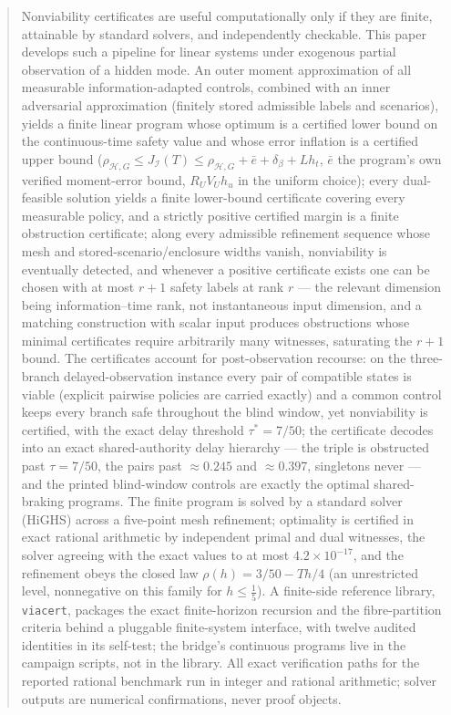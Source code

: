 \documentclass[10pt,twocolumn]{article}
\theoremstyle{plain}
\theoremstyle{definition}
\theoremstyle{remark}
\begin{document}
\begin{abstract}
Nonviability certificates are useful computationally only if they are finite,
attainable by standard solvers, and independently checkable. This paper
develops such a pipeline for linear systems under exogenous partial
observation of a hidden mode. An outer moment approximation of all measurable
information-adapted controls, combined with an inner adversarial approximation (finitely stored
admissible labels and scenarios), yields a finite linear program whose
optimum is a certified lower bound on the continuous-time safety value and
whose error inflation is a certified upper bound
(\(\rho_{\mathcal{H},G} \le J_{\mathcal{I}}(T) \le \rho_{\mathcal{H},G} +
\bar{e} + \delta_\beta + L h_t\), \(\bar{e}\) the program's own verified
moment-error bound, \(R_U V_U h_u\) in the uniform choice); every dual-feasible solution yields a finite lower-bound certificate
covering every measurable policy, and a strictly positive certified margin
is a finite obstruction certificate; along every admissible refinement
sequence whose mesh and stored-scenario/enclosure widths vanish,
nonviability is eventually detected, and whenever a positive certificate exists one can be
chosen with at most \(r + 1\) safety labels at rank \(r\) --- the relevant
dimension being information--time rank, not instantaneous input dimension,
and a matching construction with scalar input produces obstructions whose
minimal certificates require arbitrarily many witnesses, saturating the
\(r + 1\) bound. The certificates account for post-observation
recourse: on the three-branch delayed-observation instance every pair of compatible
states is viable (explicit pairwise policies are carried exactly) and a
common control keeps every branch safe throughout the blind window, yet nonviability is certified, with the exact
delay threshold \(\tau^{*} = 7/50\); the certificate decodes into an
exact shared-authority delay hierarchy --- the triple is obstructed past
\(\tau = 7/50\), the pairs past \(\approx 0.245\) and \(\approx
0.397\), singletons never --- and the printed blind-window controls are
exactly the optimal shared-braking programs. The finite program is solved by a
standard solver (HiGHS) across a five-point mesh refinement; optimality is
certified in exact rational arithmetic by independent primal and dual
witnesses, the solver agreeing with the exact values to at most
\(4.2 \times 10^{-17}\), and the refinement obeys the closed law
\(\rho(h) = 3/50 - Th/4\) (an unrestricted level, nonnegative on this
family for \(h \le \tfrac15\)). A finite-side reference library,
\texttt{viacert}, packages the exact finite-horizon recursion and the
fibre-partition criteria behind a pluggable finite-system interface, with
twelve audited identities in its self-test; the bridge's continuous
programs live in the campaign scripts, not in the library. All exact verification paths for the reported rational benchmark run in
integer and rational arithmetic; solver outputs are numerical
confirmations, never proof objects.
\end{abstract}
\end{document}
